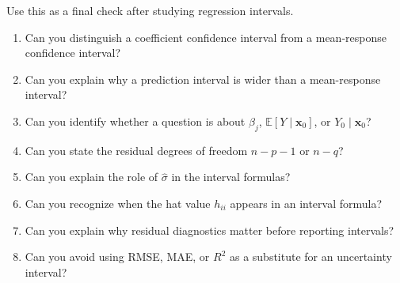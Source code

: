 Use this as a final check after studying regression intervals.

\begin{enumerate}
  \item Can you distinguish a coefficient confidence interval from a mean-response confidence interval?
  \item Can you explain why a prediction interval is wider than a mean-response interval?
  \item Can you identify whether a question is about \(\beta_j\), \(\mathbb{E}[Y\mid\mathbf{x}_0]\), or \(Y_0\mid\mathbf{x}_0\)?
  \item Can you state the residual degrees of freedom \(n-p-1\) or \(n-q\)?
  \item Can you explain the role of \(\widehat{\sigma}\) in the interval formulas?
  \item Can you recognize when the hat value \(h_{ii}\) appears in an interval formula?
  \item Can you explain why residual diagnostics matter before reporting intervals?
  \item Can you avoid using RMSE, MAE, or \(R^2\) as a substitute for an uncertainty interval?
\end{enumerate}
